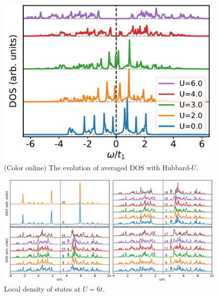 \documentclass[aps,prb,amsfonts,amsmath,amssymb,showpacs,groupedaddress,superscriptaddress]{revtex4-1}
\begin{document}
\begin{figure}[p]
    \includegraphics[width=\columnwidth]{fig/CPTForPhase1.pdf}
    \caption{\label{fig:CPTForPhase1} (Color online) The evolution of averaged DOS with Hubbard-$U$.}
\end{figure}

\begin{figure}[p]
    \centering
    \includegraphics[width=\columnwidth]{fig/CPTForPhase1LDOS.pdf}
    \caption{\label{fig:CPTForPhase1LDOS} Local density of states at $U = 6t$.}
\end{figure}
\end{document}
